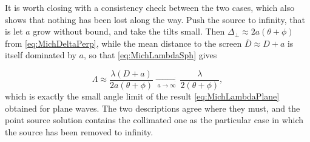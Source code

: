         It is worth closing with a consistency check between the two cases, which also shows that nothing has been lost along the way. Push the source to infinity, that is let $a$ grow without bound, and take the tilts small. Then $\Delta_\perp \approx 2a(\theta+\phi)$ from \ref{eq:MichDeltaPerp}, while the mean distance to the screen $\bar{D} \approx D + a$ is itself dominated by $a$, so that \ref{eq:MichLambdaSph} gives

        \begin{equation*}
            \Lambda \approx \frac{\lambda\left(D+a\right)}{2a\left(\theta+\phi\right)} \xrightarrow[\;a\to\infty\;]{} \frac{\lambda}{2\left(\theta+\phi\right)},
        \end{equation*}
        which is exactly the small angle limit of the result \ref{eq:MichLambdaPlane} obtained for plane waves. The two descriptions agree where they must, and the point source solution contains the collimated one as the particular case in which the source has been removed to infinity.
